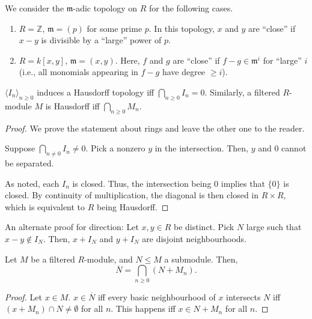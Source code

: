 \documentclass[12pt]{article}
\begin{document}
\begin{ex}
	We consider the $\mathfrak{m}$-adic topology on $R$ for the following cases.
	\begin{enumerate}
		\item $R = \mathbb{Z}$, $\mathfrak{m} = (p)$ for some prime $p$. \newline
		In this topology, $x$ and $y$ are ``close'' if $x - y$ is divisible by a ``large'' power of $p$.
		\item $R = k[x, y]$, $\mathfrak{m} = (x, y)$. \newline
		Here, $f$ and $g$ are ``close'' if $f - g \in \mathfrak{m}^{i}$ for ``large'' $i$ (i.e., all monomials appearing in $f - g$ have degree $\ge i$).
	\end{enumerate}
\end{ex}

\begin{prop} \label{prop:hausdorff-iff-trivial-intersection}
	$\langle I_{n} \rangle_{n \ge 0}$ induces a Hausdorff topology iff $\bigcap_{n \ge 0} I_{n} = 0$. \newline
	Similarly, a filtered $R$-module $M$ is Hausdorff iff $\bigcap_{n \ge 0} M_{n}$.
\end{prop}
\begin{proof} 
	We prove the statement about rings and leave the other one to the reader.

	\forward Suppose $\bigcap_{n \neq 0} I_{n} \neq 0$. Pick a nonzero $y$ in the intersection. Then, $y$ and $0$ cannot be separated.

	\backward As noted, each $I_{n}$ is closed. Thus, the intersection being $0$ implies that $\{0\}$ is closed. By continuity of multiplication, the diagonal is then closed in $R \times R$, which is equivalent to $R$ being Hausdorff.
\end{proof}

An alternate proof for \backward direction: Let $x, y \in R$ be distinct. Pick $N$ large such that $x - y \notin I_{N}$. Then, $x + I_{N}$ and $y + I_{N}$ are disjoint neighbourhoods.

\begin{prop}
	Let $M$ be a filtered $R$-module, and $N \le M$ a submodule. Then,
	\begin{equation*} 
		\overline{N} = \bigcap_{n \ge 0} (N + M_{n}).
	\end{equation*}
\end{prop}
\begin{proof} 
	Let $x \in M$. $x \in \overline{N}$ iff every basic neighbourhood of $x$ intersects $N$ iff $(x + M_{n}) \cap N \neq \emptyset$ for all $n$. This happens iff $x \in N + M_{n}$ for all $n$.
\end{proof}
\end{document}

